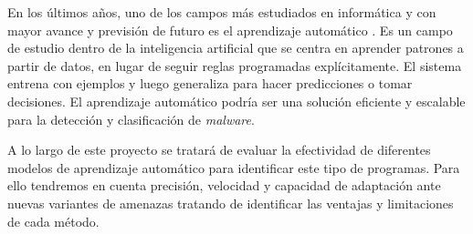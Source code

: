 \vspace{1em}

En los últimos años, uno de los campos más estudiados en  informática y con mayor avance y previsión de futuro es el aprendizaje automático \cite{ml}. Es un campo de estudio dentro de la inteligencia artificial que se centra en aprender patrones a partir de datos, en lugar de seguir reglas programadas explícitamente. El sistema entrena con ejemplos y luego generaliza para hacer predicciones o tomar decisiones. El aprendizaje automático podría ser una solución eficiente y escalable para la detección y clasificación de \textit{malware}.

\vspace{1em}

A lo largo de este proyecto se tratará de evaluar la efectividad de diferentes modelos de aprendizaje automático para identificar este tipo de programas. Para ello tendremos en cuenta precisión, velocidad y capacidad de adaptación ante nuevas variantes de amenazas tratando de identificar las ventajas y limitaciones de cada método.
